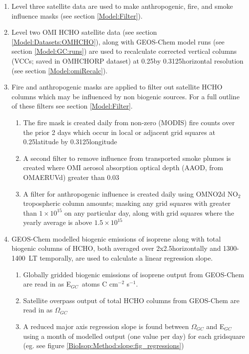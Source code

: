     \begin{enumerate}
      \item 
        Level three satellite data are used to make anthropogenic, fire, and smoke influence masks (see section \ref{Model:Filter}).
      \item 
        Level two OMI HCHO satellite data (see section \ref{Model:Datasets:OMHCHO}), along with GEOS-Chem model runs (see section \ref{Model:GC:runs}) are used to recalculate corrected vertical columns (VCCs; saved in OMHCHORP dataset) at 0.25\degr by 0.3125\degr horizontal resolution (see section \ref{Model:omiRecalc}).
      \item 
        Fire and anthropogenic masks are applied to filter out satellite HCHO columns which may be influenced by non biogenic sources.
        For a full outline of these filters see section \ref{Model:Filter}.
      \begin{enumerate}
        \item 
          The fire mask is created daily from non-zero (MODIS) fire counts over the prior 2 days which occur in local or adjacent grid squares at 0.25\degr latitude by 0.3125\degr longitude
        \item 
          A second filter to remove influence from transported smoke plumes is created where OMI aerosol absorption optical depth (AAOD, from OMAERUVd) greater than 0.03
        \item 
          A filter for anthropogenic influence is created daily using OMNO2d NO$_2$ tropospheric column amounts; masking any grid squares with greater than $1\times 10 ^{15}$ on any particular day, along with grid squares where the yearly average is above $1.5 \times 10^{15}$\moleccm
      \end{enumerate}
      \item 
      GEOS-Chem modelled biogenic emissions of isoprene along with total biogenic columns of HCHO, both averaged over 2x2.5\degr horizontally  and 1300-1400~LT temporally, are used to calculate a linear regression slope.
      \begin{enumerate}
        \item Globally gridded biogenic emissions of isoprene output from GEOS-Chem are read in as E$_{GC}$~atoms C cm$^{-2}$ s$^{-1}$.
        \item Satellite overpass output of total HCHO columns from GEOS-Chem are read in as $\Omega_{GC}$\moleccm
        \item A reduced major axis regression slope is found between $\Omega_{GC}$ and E$_{GC}$ using a month of modelled output (one value per day) for each gridsquare (eg. see figure \ref{BioIsop:Method:slope:fig_regressions})

\end{enumerate}
\end{enumerate}
